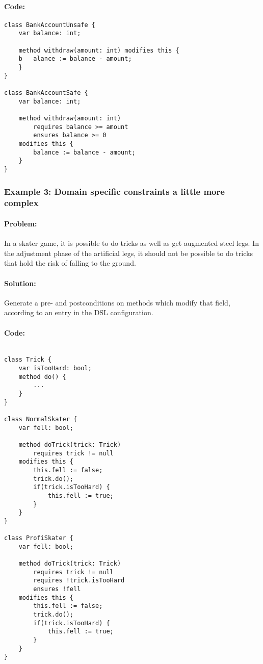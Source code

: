 \paragraph{Code:}
\lstset{style=dafny}
\begin{lstlisting}
class BankAccountUnsafe {
	var balance: int;
	
	method withdraw(amount: int) modifies this {
	b	alance := balance - amount;
	}
}

class BankAccountSafe {
	var balance: int;
	
	method withdraw(amount: int) 
		requires balance >= amount  
		ensures balance >= 0  
	modifies this {
		balance := balance - amount;
	}
}
\end{lstlisting}


\subsubsection{Example 3: Domain specific constraints a little more complex}
\paragraph{Problem:}
In a skater game, it is possible to do tricks as well as get augmented steel legs. In the adjustment phase of the artificial legs, it should not be possible to do tricks that hold the risk of falling to the ground.
\paragraph{Solution:}
Generate a pre- and postconditions on methods which modify that field, according to an entry in the DSL configuration.
\paragraph{Code:}
\lstset{style=dafny}
\begin{lstlisting}

class Trick {
	var isTooHard: bool;
	method do() {
		...
	}
}

class NormalSkater {
	var fell: bool;
	
	method doTrick(trick: Trick) 
		requires trick != null
	modifies this {
		this.fell := false;
		trick.do();
		if(trick.isTooHard) {
			this.fell := true;
		}
	}
}

class ProfiSkater {
	var fell: bool;
	
	method doTrick(trick: Trick) 
		requires trick != null
		requires !trick.isTooHard
		ensures !fell
	modifies this {
		this.fell := false;
		trick.do();
		if(trick.isTooHard) {
			this.fell := true;
		}
	}
}

\end{lstlisting}
